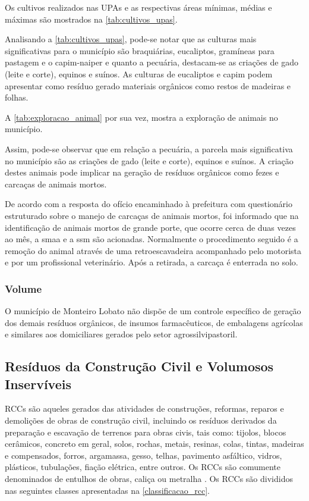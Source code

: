 	Os cultivos realizados nas UPAs e as respectivas áreas mínimas, médias e máximas são mostrados na \autoref{tab:cultivos_upas}.
	
	
	
	Analisando a \autoref{tab:cultivos_upas}, pode-se notar que as culturas mais significativas para o município são braquiárias, eucaliptos, gramíneas para pastagem e o capim-naiper e quanto a pecuária, destacam-se as criações de gado (leite e corte), equinos e suínos. As culturas de eucaliptos e capim podem apresentar como resíduo gerado materiais orgânicos como restos de madeiras e folhas.
	
	A \autoref{tab:exploracao_animal} por sua vez, mostra a exploração de animais no município.
	
	
	
	Assim, pode-se observar que em relação a pecuária, a parcela mais significativa no município são as criações de gado (leite e corte), equinos e suínos. A criação destes animais pode implicar na geração de resíduos orgânicos como fezes e carcaças de animais mortos.
	
	De acordo com a resposta do ofício encaminhado à prefeitura com questionário estruturado sobre o manejo de carcaças de animais mortos, foi informado que na identificação de animais mortos de grande porte, que ocorre cerca de duas vezes ao mês, a \gls{smaa} e a \gls{ssm} são acionadas. Normalmente o procedimento seguido é a remoção do animal através de uma retroescavadeira acompanhado pelo motorista e por um profissional veterinário. Após a retirada, a carcaça é enterrada no solo.
	
	\subsubsection{Volume}
	O município de Monteiro Lobato não dispõe de um controle específico de geração dos demais resíduos orgânicos, de insumos farmacêuticos, de embalagens agrícolas e similares aos domiciliares gerados pelo setor agrossilvipastoril.
	
	\subsection{Resíduos da Construção Civil e Volumosos Inservíveis}
	RCCs são aqueles gerados das atividades de construções, reformas, reparos e demolições de obras de construção civil, incluindo os resíduos derivados da preparação e escavação de terrenos para obras civis, tais como: tijolos, blocos cerâmicos, concreto em geral, solos, rochas, metais, resinas, colas, tintas, madeiras e compensados, forros, argamassa, gesso, telhas, pavimento asfáltico, vidros, plásticos, tubulações, fiação elétrica, entre outros. Os RCCs são comumente denominados de entulhos de obras, caliça ou metralha \cite{brasil:12305, conama:307}. Os RCCs são divididos nas seguintes classes apresentadas na \autoref{classificacao_rcc}.
	
